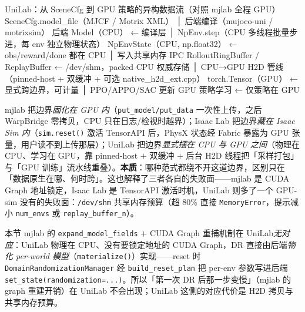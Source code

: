 \begin{codebox}[text]{UniLab：从 SceneCfg 到 GPU 策略的异构数据流（对照 mjlab 全程 GPU）}
SceneCfg.model_file（MJCF / Motrix XML）
  │ 后端编译（mujoco-uni / motrixsim）
后端 Model（CPU）              ← 编译层
  │ NpEnv.step（CPU 多线程批量步进，每 env 独立物理状态）
NpEnvState（CPU, np.float32）   ← obs/reward/done 都在 CPU
  │ 写入共享内存 IPC
RolloutRingBuffer / ReplayBuffer  ← /dev/shm，packed CPU 权威存储
  │ CPU→GPU H2D 管线（pinned-host + 双缓冲 + 可选 native_h2d_ext.cpp）
torch.Tensor（GPU）             ← 显式跨边界，可计量
  │ PPO/APPO/SAC 更新
GPU 策略学习                   ← 仅策略在 GPU
\end{codebox}

\begin{insight}\label{ins:rlmc-phys-boundary}
mjlab 把边界\emph{固化在 GPU 内}（\verb|put_model/put_data| 一次性上传，之后 WarpBridge 零拷贝，CPU 只在日志/检视时越界）；Isaac Lab 把边界\emph{藏在 Isaac Sim 内}（\verb|sim.reset()| 激活 TensorAPI 后，PhysX 状态经 Fabric 暴露为 GPU 张量，用户读不到上传那层）；UniLab 把边界\emph{显式摆在 CPU 与 GPU 之间}（物理在 CPU、学习在 GPU，靠 pinned-host $+$ 双缓冲 $+$ 后台 H2D 线程把「采样打包」与「GPU 训练」流水线重叠）。\textbf{本质}：哪种范式都绕不开这道边界，区别只在「数据原生在哪、何时跨」。这也解释了三者各自的失败面——mjlab 是 CUDA Graph 地址锁定，Isaac Lab 是 TensorAPI 激活时机，UniLab 则多了一个 GPU-sim 没有的失败面：\verb|/dev/shm| 共享内存预算（超 80\% 直接 \verb|MemoryError|，提示减小 \verb|num_envs| 或 \verb|replay_buffer_n|）。
\end{insight}

\begin{note}
本节 mjlab 的 \verb|expand_model_fields| $+$ CUDA Graph 重捕机制在 UniLab\emph{无对应}：UniLab 物理在 CPU、没有要锁定地址的 CUDA Graph，DR 直接由后端\emph{物化 per-world 模型}（\verb|materialize()|）实现——reset 时 \verb|DomainRandomizationManager| 经 \verb|build_reset_plan| 把 per-env 参数写进后端 \verb|set_state(randomization=...)|。所以「第一次 DR 后那一步变慢」（mjlab 的 graph 重建开销）在 UniLab 不会出现；UniLab 这侧的对应代价是 H2D 拷贝与共享内存预算。
\end{note}

